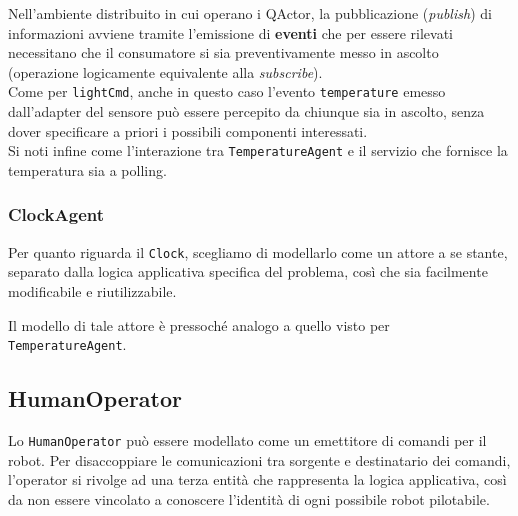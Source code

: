 \documentclass{../llncs}
\newcommand{\codescript}[1]{{\mbox{\small{\texttt{#1}}}}\xspace}
\newcommand{\labelssec}[1]{\label{ssec:#1}}
\begin{document}
Nell'ambiente distribuito in cui operano i QActor, la pubblicazione (\textit{publish}) di informazioni avviene tramite l'emissione di \textbf{eventi} che per essere rilevati necessitano che il consumatore si sia preventivamente messo in ascolto (operazione logicamente equivalente alla \textit{subscribe}).\\



Come per \codescript{lightCmd}, anche in questo caso l'evento \codescript{temperature}%
emesso dall'adapter del sensore può essere percepito da chiunque sia in ascolto, senza dover specificare a priori i possibili componenti interessati.\\

Si noti infine come l'interazione tra \codescript{TemperatureAgent} e il servizio che fornisce la temperatura sia a polling.

\subsubsection{ClockAgent}
Per quanto riguarda il \texttt{Clock}, scegliamo di modellarlo come un attore a se stante, separato dalla logica applicativa specifica del problema, così che sia facilmente modificabile e riutilizzabile.%

Il modello di tale attore è pressoché analogo a quello visto per \texttt{TemperatureAgent}.\\



\subsection{HumanOperator}
\labelssec{humanOpRA}
Lo \texttt{HumanOperator} può essere modellato come un emettitore di comandi per il robot. Per disaccoppiare le comunicazioni tra sorgente e destinatario dei comandi, l'operator si rivolge ad una terza entità che rappresenta la logica applicativa, così da non essere vincolato a conoscere l'identità di ogni possibile robot pilotabile.
\end{document}
